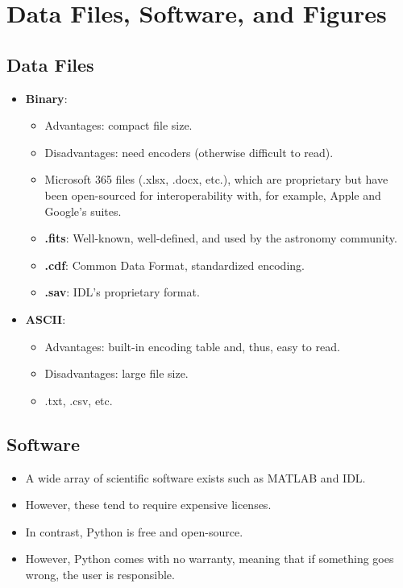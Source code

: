 \section {Data Files, Software, and Figures}

\subsection{Data Files}
\begin{itemize}
    \item \textbf{Binary}:
          \begin{itemize}
              \item Advantages: compact file size.
              \item Disadvantages: need encoders (otherwise difficult to read).
              \item Microsoft 365 files (.xlsx, .docx, etc.), which are proprietary but have been open-sourced for interoperability with, for example, Apple and Google's suites.
              \item \textbf{.fits}: Well-known, well-defined, and used by the astronomy community.
              \item \textbf{.cdf}: Common Data Format, standardized encoding.
              \item \textbf{.sav}: IDL's proprietary format.
          \end{itemize}
    \item \textbf{ASCII}:
          \begin{itemize}
              \item Advantages: built-in encoding table and, thus, easy to read.
              \item Disadvantages: large file size.
              \item .txt, .csv, etc.
          \end{itemize}
\end{itemize}

\subsection{Software}
\begin{itemize}
    \item A wide array of scientific software exists such as MATLAB and IDL.
    \item However, these tend to require expensive licenses.
    \item In contrast, Python is free and open-source.
    \item However, Python comes with no warranty, meaning that if something goes wrong, the user is responsible.
\end{itemize}

